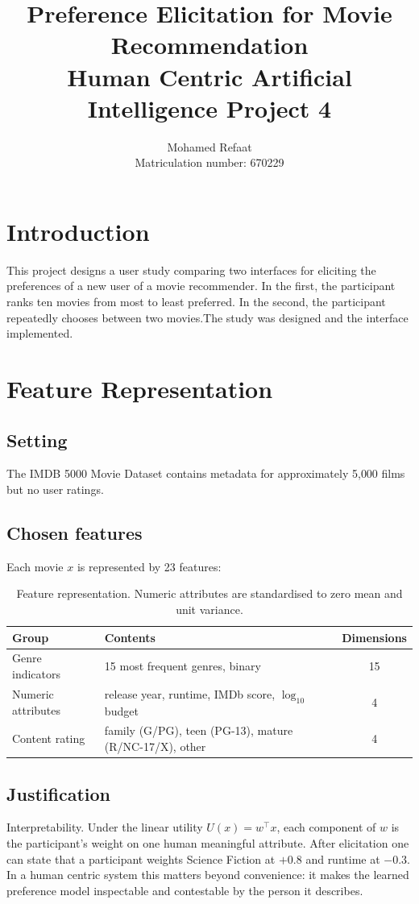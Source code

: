 \documentclass[11pt]{article}
\title{Preference Elicitation for Movie Recommendation\\\large Human Centric Artificial Intelligence  Project 4}
\author{Mohamed Refaat\\Matriculation number: 670229}
\date{}
\begin{document}
\maketitle

\section{Introduction}
This project designs a user study comparing two interfaces for eliciting the preferences of a new user of a movie recommender. In the first, the participant ranks ten movies from most to least preferred. In the second,  the participant repeatedly chooses between two movies.The study was designed and the interface implemented.


\section{Feature Representation}
\label{sec:features}

\subsection{Setting}
The IMDB 5000 Movie Dataset contains metadata for approximately 5{,}000 films but no user ratings. 
\subsection{Chosen features}
Each movie $x$ is represented by 23 features:

\begin{table}[H]
\centering
\begin{tabular}{llc}
\toprule
Group & Contents & Dimensions \\
\midrule
Genre indicators & 15 most frequent genres, binary & 15 \\
Numeric attributes & release year, runtime, IMDb score, $\log_{10}$ budget & 4 \\
Content rating & family (G/PG), teen (PG-13), mature (R/NC-17/X), other & 4 \\
\bottomrule
\end{tabular}
\caption{Feature representation. Numeric attributes are standardised to zero mean and unit variance.}
\end{table}

\subsection{Justification}
Interpretability. Under the linear utility $U(x) = w^\top x$, each component of $w$ is the participant's weight on one human meaningful attribute. After elicitation one can state that a participant weights Science Fiction at $+0.8$ and runtime at $-0.3$. In a human centric system this matters beyond convenience: it makes the learned preference model inspectable and contestable by the person it describes.
\end{document}
